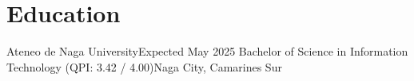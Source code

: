 \section{Education}

\resumeSubHeadingListStart
    \resumeSubheading
    {Ateneo de Naga University}{Expected May 2025}
    {Bachelor of Science in Information Technology (QPI: 3.42 / 4.00)}{Naga City, Camarines Sur}
\resumeSubHeadingListEnd
